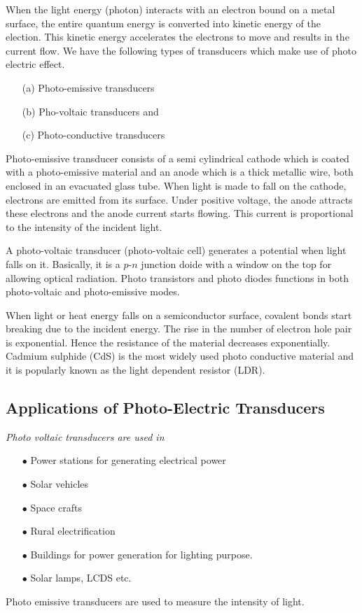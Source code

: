 When the light energy (photon) interacts with an electron bound on a metal surface, the entire quantum energy is converted into kinetic energy of the election. This kinetic energy accelerates the electrons to move and results in the current flow. We have the following types of transducers which make use of photo electric effect.
\begin{itemize}
\item[(a)] Photo-emissive transducers

\item[(b)] Pho-voltaic transducers and

\item[(c)] Photo-conductive transducers 
\end{itemize}

Photo-emissive transducer consists of a semi cylindrical cathode which is coated with a photo-emissive material and an anode which is a thick metallic wire, both enclosed in an evacuated glass tube. When light is made to fall on the cathode, electrons are emitted from its surface. Under positive voltage, the anode attracts  these electrons and the anode current starts flowing. This current is proportional to the intensity of the incident light.

A photo-voltaic transducer (photo-voltaic cell) generates a potential when light falls on it. Basically, it is a $p$-$n$ junction doide with a window on the top for allowing optical radiation. Photo transistors and photo diodes functions in both photo-voltaic and photo-emissive modes.

When light or heat energy falls on a semiconductor surface, covalent bonds start breaking due to the incident energy. The rise in the number of electron hole pair is exponential. Hence the resistance of the material decreases exponentially. Cadmium sulphide (CdS) is the most widely used photo conductive material and it is popularly known as the light dependent resistor (LDR).

\subsection{Applications of Photo-Electric Transducers}\label{sec8.15.1}

{\em Photo voltaic transducers are used in}
\begin{itemize}
\item[$\bullet$] Power stations for generating electrical power

\item[$\bullet$] Solar vehicles 

\item[$\bullet$] Space crafts

\item[$\bullet$] Rural electrification 

\item[$\bullet$] Buildings for power generation for lighting purpose.

\item[$\bullet$] Solar lamps, LCDS etc.
\end{itemize}
Photo emissive transducers are used to measure the intensity of light.

